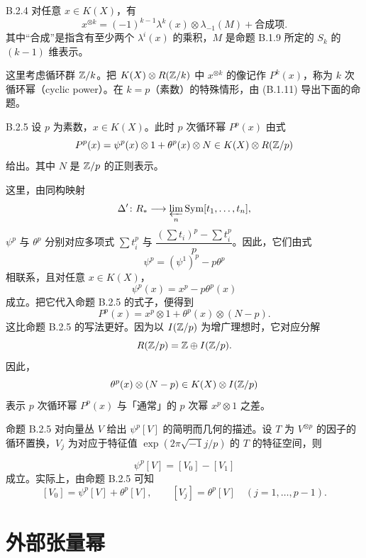\begin{proposition*}{B.2.4}
  对任意 $x\in K(X)$，有
  \[
  x^{\otimes k}=(-1)^{k-1}\lambda^k(x)\otimes\lambda_{-1}(M)+\text{合成项}.
  \]
  其中“合成”是指含有至少两个 $\lambda^i(x)$ 的乘积，$M$ 是命题 B.1.9 所定的 $S_k$ 的 $(k-1)$ 维表示。
\end{proposition*}

这里考虑循环群 $\mathbb{Z}/k$。把 $K(X)\otimes R(\mathbb{Z}/k)$ 中 $x^{\otimes k}$ 的像记作 $P^k(x)$，称为 $k$ 次循环幂（cyclic power）。在 $k=p$（素数）的特殊情形，由 (B.1.11) 导出下面的命题。

\begin{proposition*}{B.2.5}
  设 $p$ 为素数，$x\in K(X)$。此时 $p$ 次循环幂 $P^p(x)$ 由式
  \[
  P^p(x)=\psi^p(x)\otimes1+\theta^p(x)\otimes N\in K(X)\otimes R(\mathbb{Z}/p)
  \]
  给出。其中 $N$ 是 $\mathbb{Z}/p$ 的正则表示。
\end{proposition*}

这里，由同构映射
\[
\Delta'\colon R_*\longrightarrow\varprojlim_{n}\operatorname{Sym}[t_1,\dots,t_n],
\]
$\psi^p$ 与 $\theta^p$ 分别对应多项式 $\sum t_i^p$ 与 $\dfrac{(\sum t_i)^p-\sum t_i^p}{p}$。因此，它们由式
\[
\psi^p=(\psi^1)^p-p\theta^p
\]
相联系，且对任意 $x\in K(X)$，
\[
\psi^p(x)=x^p-p\theta^p(x)
\]
成立。把它代入命题 B.2.5 的式子，便得到
\begin{equation}
P^p(x)=x^p\otimes1+\theta^p(x)\otimes(N-p). \tag{B.2.6}
\end{equation}
这比命题 B.2.5 的写法更好。因为以 $I(\mathbb{Z}/p)$ 为增广理想时，它对应分解
\[
R(\mathbb{Z}/p)=\mathbb{Z}\oplus I(\mathbb{Z}/p).
\]
因此，
\[
\theta^p(x)\otimes(N-p)\in K(X)\otimes I(\mathbb{Z}/p)
\]
表示 $p$ 次循环幂 $P^p(x)$ 与「通常」的 $p$ 次幂 $x^p\otimes1$ 之差。

命题 B.2.5 对向量丛 $V$ 给出 $\psi^p[V]$ 的简明而几何的描述。设 $T$ 为 $V^{\otimes p}$ 的因子的循环置换，$V_j$ 为对应于特征值 $\exp(2\pi\sqrt{-1}j/p)$ 的 $T$ 的特征空间，则

\begin{equation}
\psi^p[V]=[V_0]-[V_1] \tag{B.2.7}
\end{equation}
成立。实际上，由命题 B.2.5 可知
\[
[V_0]=\psi^p[V]+\theta^p[V],\qquad [V_j]=\theta^p[V]\quad(j=1,\dots,p-1).
\]

\section{外部张量幂}

